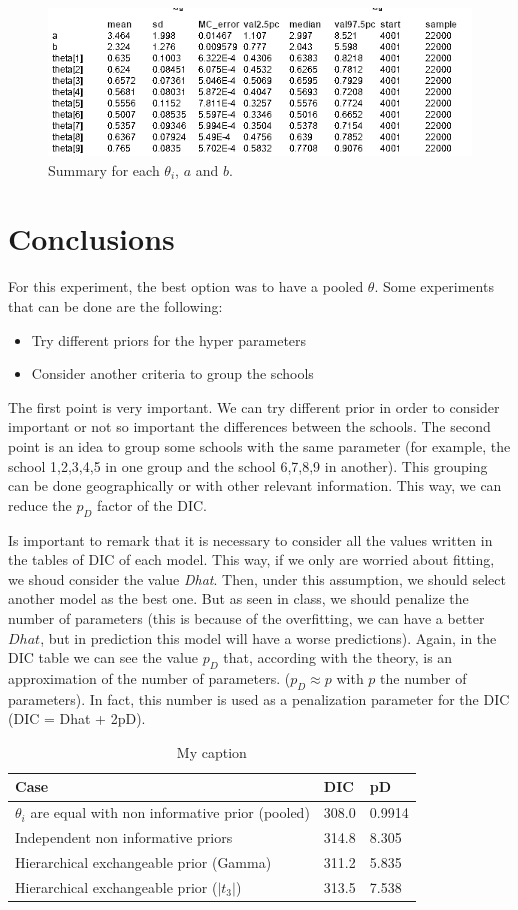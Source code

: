 \documentclass{article}
\begin{document}
  \begin{figure}[ht!]
  \centering
  \includegraphics[width=.65\textwidth]{imgs/M3b_5.png}
  \caption{Summary for each $\theta_i$, $a$ and $b$.}
  \label{fig:fig16}
  \end{figure}
\newpage
\section{Conclusions}

For this experiment, the best option was to have a pooled $\theta$. Some experiments that can be done are the following:
\begin{itemize}
\item{Try different priors for the hyper parameters}
\item{Consider another criteria to group the schools}
\end{itemize}

The first point is very important. We can try different prior in order to consider important or not so important the differences between the schools. The second point is an idea to group some schools with the same parameter (for example, the school 1,2,3,4,5 in one group and the school 6,7,8,9 in another). This grouping can be done geographically or with other relevant information. This way, we can reduce the $p_D$ factor of the DIC.

Is important to remark that it is necessary to consider all the values written in the tables of DIC of each model. This way, if we only are worried about fitting, we shoud consider the value \textit{Dhat}. Then, under this assumption, we should select another model as the best one. But as seen in class, we should penalize the number of parameters (this is because of the overfitting, we can have a better $Dhat$, but in prediction this model will have a worse predictions). Again, in the DIC table we can see the value $p_D$ that, according with the theory, is an approximation of the number of parameters. ($p_D \approx p$ with $p$ the number of parameters). In fact, this number is used as a penalization parameter for the DIC (DIC = Dhat + 2pD). 

\begin{table}[ht!] 
\centering
\caption{My caption}
\label{my-label}
\begin{tabular}{l|l|l}
Case                                            & DIC   & pD\\ \hline
$\theta_i$ are equal with non informative prior (pooled) & 308.0 & 0.9914\\
Independent non informative priors              & 314.8 & 8.305 \\
Hierarchical exchangeable prior (Gamma)         & 311.2 & 5.835\\
Hierarchical exchangeable prior ($|t_3|$)       & 313.5 & 7.538
\end{tabular}
\end{table}
\end{document}
